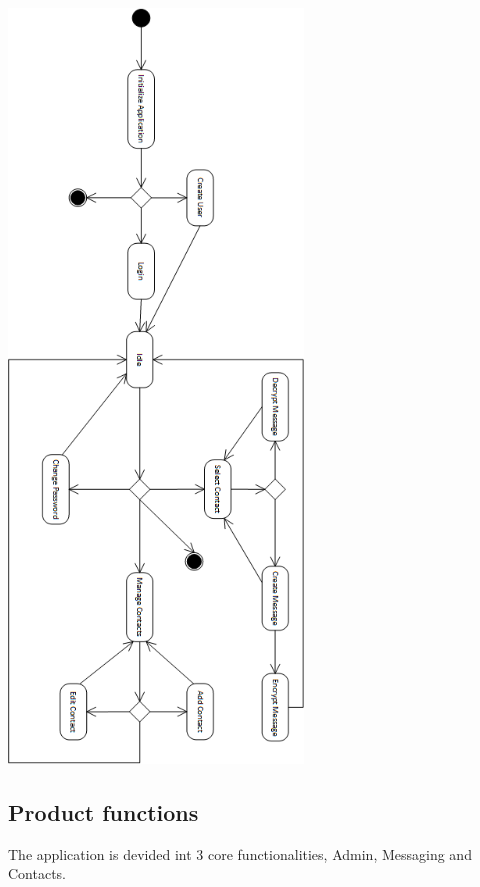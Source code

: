 \begin{center}
 \includegraphics[height=20cm]{diagrams/StateDiagrams/GeneralStateDiagram.png}
\end{center}


\subsection{Product functions}
The application is devided int 3 core functionalities, Admin, Messaging and Contacts.

